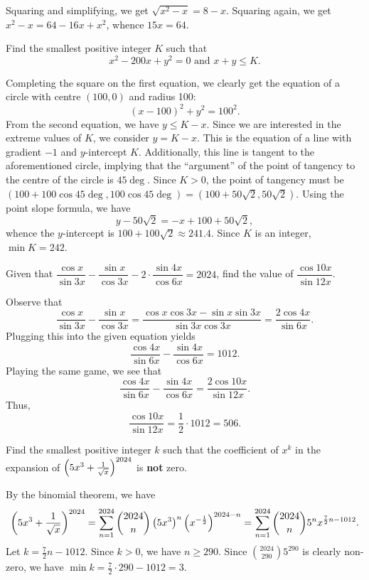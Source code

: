 Squaring and simplifying, we get $\sqrt{x^2 - x} = 8 - x$. Squaring again, we get $x^2 - x = 64 - 16x + x^2$, whence $15x = 64$.

\begin{question}[242]\label{A::2024-S-1-7}
    Find the smallest positive integer $K$ such that \[x^2 - 200x + y^2 = 0 \text{ and } x + y \leq K.\]
\end{question}

Completing the square on the first equation, we clearly get the equation of a circle with centre $(100, 0)$ and radius 100: \[(x - 100)^2 + y^2 = 100^2.\] From the second equation, we have $y \leq K - x$. Since we are interested in the extreme values of $K$, we consider $y = K - x$. This is the equation of a line with gradient $-1$ and $y$-intercept $K$. Additionally, this line is tangent to the aforementioned circle, implying that the ``argument'' of the point of tangency to the centre of the circle is $45\deg$. Since $K > 0$, the point of tangency must be $(100 + 100\cos{45\deg}, 100\cos{45\deg}) = (100 + 50\sqrt2, 50\sqrt2)$. Using the point slope formula, we have \[y - 50\sqrt2 = -x + 100 + 50\sqrt2,\] whence the $y$-intercept is $100 + 100\sqrt{2} \approx 241.4$. Since $K$ is an integer, $\min K = 242$.

\begin{question}[506]\label{A::2024-S-1-8}
    Given that $\dfrac{\cos{x}}{\sin{3x}} - \dfrac{\sin{x}}{\cos{3x}} - 2 \cdot \dfrac{\sin{4x}}{\cos{6x}} = 2024$, find the value of $\dfrac{\cos{10x}}{\sin{12x}}$.
\end{question}

Observe that \[\frac{\cos x}{\sin 3x} - \frac{\sin x}{\cos 3x} = \frac{\cos x \cos 3x - \sin x \sin 3x}{\sin 3x \cos 3x} = \frac{2\cos 4x}{\sin 6x}.\] Plugging this into the given equation yields \[\frac{\cos 4x}{\sin 6x} - \dfrac{\sin 4x}{\cos 6x} = 1012.\] Playing the same game, we see that \[\frac{\cos 4x}{\sin 6x} - \dfrac{\sin 4x}{\cos 6x} = \frac{2\cos 10x}{\sin 12x}.\] Thus, \[\frac{\cos 10x}{\sin 12x} = \frac12 \cdot 1012 = 506.\]

\begin{question}[3]\label{A::2024-S-1-9}
    Find the smallest positive integer $k$ such that the coefficient of $x^k$ in the expansion of $\left( 5x^3 + \frac1{\sqrt{x}} \right)^{2024}$ is \textbf{not} zero.
\end{question}

By the binomial theorem, we have \[\left( 5x^3 + \frac1{\sqrt{x}} \right)^{2024} = \sum_{n = 1}^{2024} \binom{2024}{n} \left( 5x^3 \right)^n \left( x^{-\frac12} \right)^{2024-n} = \sum_{n = 1}^{2024} \binom{2024}{n} 5^n x^{\frac72 n - 1012}.\] Let $k = \frac72 n - 1012$. Since $k > 0$, we have $n \geq 290$. Since $\binom{2024}{290} 5^{290}$ is clearly non-zero, we have $\min k = \frac72 \cdot 290 - 1012 = 3$.


